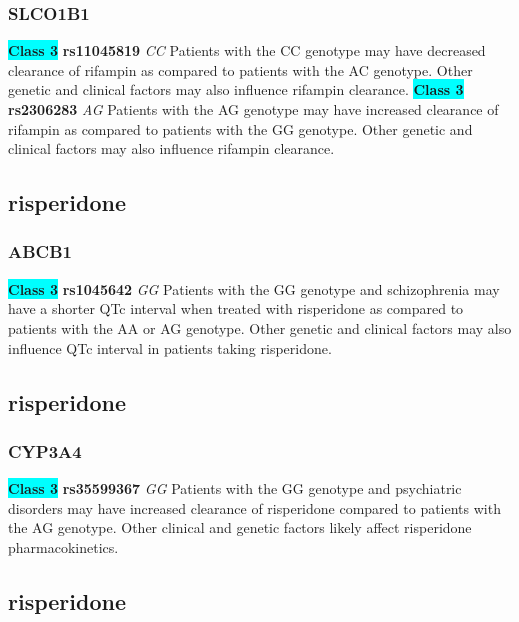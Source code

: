 \documentclass{book}
\begin{document}
\subsubsection{ SLCO1B1 }

\begin{center}
\textbf{\colorbox{cyan} {Class 3}} \textbf{ rs11045819 } \textit{ CC }
Patients with the CC genotype may have decreased clearance of rifampin as compared to patients with the AC genotype. Other genetic and clinical factors may also influence rifampin clearance. \textbf{\colorbox{cyan} {Class 3}} \textbf{ rs2306283 } \textit{ AG }
Patients with the AG genotype may have increased clearance of rifampin as compared to patients with the GG genotype. Other genetic and clinical factors may also influence rifampin clearance. 


\end{center}\subsection{ risperidone }


\subsubsection{ ABCB1 }

\begin{center}
\textbf{\colorbox{cyan} {Class 3}} \textbf{ rs1045642 } \textit{ GG }
Patients with the GG genotype and schizophrenia may have a shorter QTc interval when treated with risperidone as compared to patients with the AA or AG genotype. Other genetic and clinical factors may also influence QTc interval in patients taking risperidone.


\end{center}\subsection{ risperidone }


\subsubsection{ CYP3A4 }

\begin{center}
\textbf{\colorbox{cyan} {Class 3}} \textbf{ rs35599367 } \textit{ GG }
Patients with the GG genotype and psychiatric disorders may have increased clearance of risperidone compared to patients with the AG genotype. Other clinical and genetic factors likely affect risperidone pharmacokinetics.


\end{center}\subsection{ risperidone }
\end{document}
